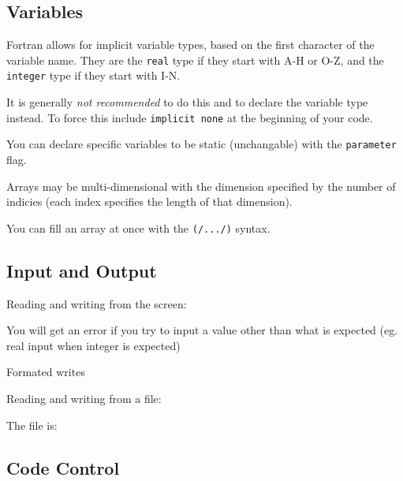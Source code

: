 \subsection{Variables}
Fortran allows for implicit variable types, based on the first character of the variable name. They are the \texttt{real} type if they start with A-H or O-Z, and the \texttt{integer} type if they start with I-N.

It is generally \emph{not recommended} to do this and to declare the variable type instead. To force this include \texttt{implicit none} at the beginning of your code.

You can declare specific variables to be static (unchangable) with the \texttt{parameter} flag.

Arrays may be multi-dimensional with the dimension specified by the number of indicies (each index specifies the length of that dimension).

You can fill an array at once with the \texttt{(/.../)} syntax.
\begin{quote}

\end{quote}


\subsection{Input and Output}
Reading and writing from the screen:
\begin{quote}

\end{quote}
\noindent You will get an error if you try to input a value other than what is expected (eg. real input when integer is expected)

Formated writes
\begin{quote}

\end{quote}

\noindent Reading and writing from a file:
\begin{quote}

\end{quote}
\noindent The file is:
\begin{quote}

\end{quote}

\subsection{Code Control}

